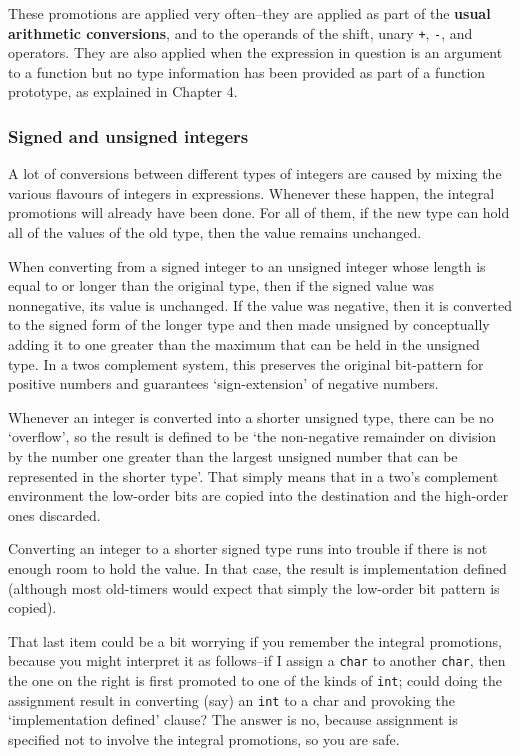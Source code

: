     These promotions are applied very often--they are applied as part
     of the \textbf{usual arithmetic conversions}, and to the operands of
     the shift, unary \texttt{+}, \texttt{-}, and \texttt{~}
     operators. They are also applied when the expression in question is an
     argument to a function but no type information has been provided as part
     of a function prototype, as explained in Chapter 4.


   

   \subsubsection{Signed and unsigned integers}
    

    A lot of conversions between different types of integers are caused by
     mixing the various flavours of integers in expressions. Whenever these
     happen, the integral promotions will already have been done. For all of
     them, if the new type can hold all of the values of the old type, then
     the value remains unchanged.


    When converting from a signed integer to an unsigned integer whose
     length is equal to or longer than the original type, then if the signed
     value was nonnegative, its value is unchanged. If the value was negative,
     then it is converted to the signed form of the longer type and then made
     unsigned by conceptually adding it to one greater than the maximum that
     can be held in the unsigned type. In a twos complement system, this
     preserves the original bit-pattern for positive numbers and guarantees
     `sign-extension' of negative numbers.


    Whenever an integer is converted into a shorter unsigned type, there
     can be no `overflow', so the result is defined to be `the
     non-negative remainder on division by the number one greater than the
     largest unsigned number that can be represented in the shorter type'.
     That simply means that in a two's complement environment the low-order
     bits are copied into the destination and the high-order ones
     discarded.


    Converting an integer to a shorter signed type runs into trouble if
     there is not enough room to hold the value. In that case, the result is
     implementation defined (although most old-timers would expect that simply
     the low-order bit pattern is copied).


    That last item could be a bit worrying if you remember the integral
     promotions, because you might interpret it as follows--if I assign
     a \texttt{char} to another \texttt{char}, then the one on the
     right is first promoted to one of the kinds of \texttt{int}; could
     doing the assignment result in converting (say) an \texttt{int} to a
     char and provoking the `implementation defined' clause? The answer
     is no, because assignment is specified not to involve the integral
     promotions, so you are safe.


